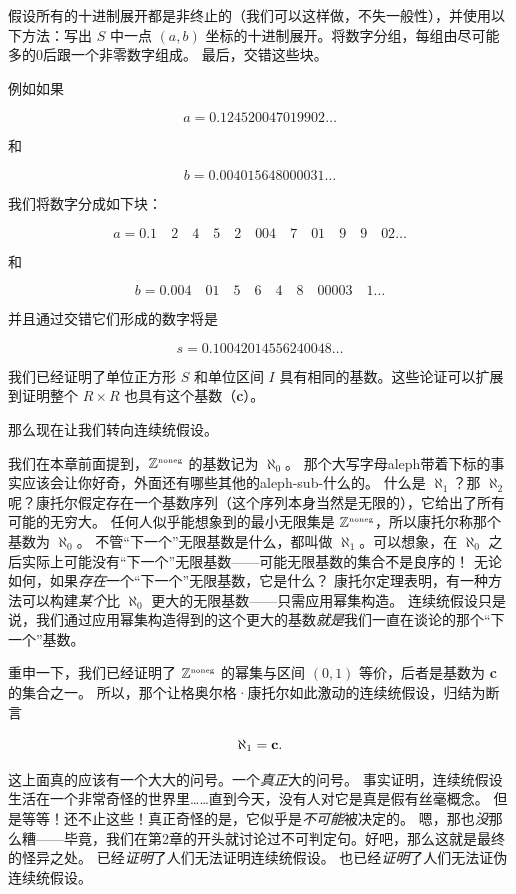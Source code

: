 假设所有的十进制展开都是非终止的（我们可以这样做，不失一般性），并使用以下方法：写出 $S$ 中一点 $(a, b)$ 坐标的十进制展开。将数字分组，每组由尽可能多的0后跟一个非零数字组成。
最后，交错这些块。

例如如果

\[ a = 0.124520047019902 \ldots \]

\noindent 和

\[ b = 0.004015648000031 \ldots \]

\noindent 我们将数字分成如下块：

\[ a = 0.1 \quad 2 \quad 4 \quad 5\quad 2 \quad 004\quad 7\quad 01\quad 9 \quad 9 \quad 02 \ldots \]

\noindent 和

\[ b = 0.004 \quad 01 \quad  5 \quad  6 \quad  4 \quad  8 \quad  00003 \quad  1 \ldots \]

\noindent 并且通过交错它们形成的数字将是

\[ s = 0.10042014556240048 \ldots \]

我们已经证明了单位正方形 $S$ 和单位区间 $I$ 具有相同的基数。这些论证可以扩展到证明整个 $R \times R$ 也具有这个基数（{\bf c}）。

那么现在让我们转向连续统假设。

我们在本章前面提到，${\mathbb Z}^{\mbox{\tiny noneg}}$ 的基数记为 $\aleph_0$。
那个大写字母aleph带着下标的事实应该会让你好奇，外面还有哪些其他的aleph-sub-什么的。
什么是 $\aleph_1$？那 $\aleph_2$ 呢？康托尔假定存在一个基数序列（这个序列本身当然是无限的），它给出了所有可能的无穷大。
任何人似乎能想象到的最小无限集是 ${\mathbb Z}^{\mbox{\tiny noneg}}$，所以康托尔称那个基数为 $\aleph_0$。
不管“下一个”无限基数是什么，都叫做 $\aleph_1$。可以想象，在 $\aleph_0$ 之后实际上可能没有“下一个”无限基数——可能无限基数的集合不是良序的！
无论如何，如果\emph{存在}一个“下一个”无限基数，它是什么？
康托尔定理表明，有一种方法可以构建\emph{某个}比 $\aleph_0$ 更大的无限基数——只需应用幂集构造。
连续统假设只是说，我们通过应用幂集构造得到的这个更大的基数\emph{就是}我们一直在谈论的那个“下一个”基数。

重申一下，我们已经证明了 ${\mathbb Z}^{\mbox{\tiny noneg}}$ 的幂集与区间 $(0,1)$ 等价，后者是基数为 {\bf c} 的集合之一。
所以，那个让格奥尔格·康托尔如此激动的连续统假设，归结为断言

\[ \aleph_1 = \mbox{{\bf c}}.
\]

这上面真的应该有一个大大的问号。一个\emph{真正}大的问号。
事实证明，连续统假设生活在一个非常奇怪的世界里……直到今天，没有人对它是真是假有丝毫概念。
但是等等！还不止这些！真正奇怪的是，它似乎是\emph{不可能}被决定的。
嗯，那也\emph{没}那么糟——毕竟，我们在第2章的开头就讨论过不可判定句。好吧，那么这就是最终的怪异之处。
已经\emph{证明}了人们无法证明连续统假设。
也已经\emph{证明}了人们无法证伪连续统假设。

